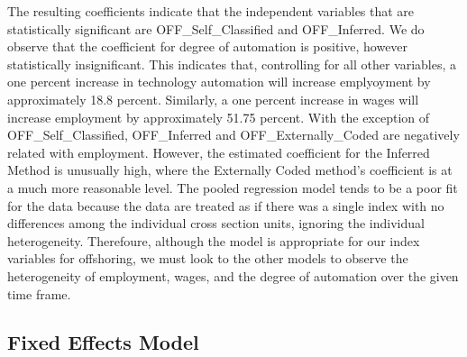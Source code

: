 \documentclass[12pt]{article}
\begin{document}
The resulting coefficients indicate that the independent variables that are statistically significant are OFF\_Self\_Classified and OFF\_Inferred. We do observe that the coefficient for degree of automation is positive, however statistically insignificant. This indicates that, controlling for all other variables, a one percent increase in technology automation will increase emplyoyment by approximately 18.8 percent. Similarly, a one percent increase in wages will increase employment by approximately 51.75 percent. With the exception of OFF\_Self\_Classified, OFF\_Inferred and OFF\_Externally\_Coded are negatively related with employment. However, the estimated coefficient for the Inferred Method is unusually high, where the Externally Coded method's coefficient is at a much more reasonable level.
\break
\linebreak
The pooled regression model tends to be a poor fit for the data because the data are treated as if there was a single index with no differences among the individual cross section units, ignoring the individual heterogeneity. Therefoure, although the model is appropriate for our index variables for offshoring, we must look to the other models to observe the heterogeneity of employment, wages, and the degree of automation over the given time frame.

\newpage

\subsection{Fixed Effects Model}
\end{document}
